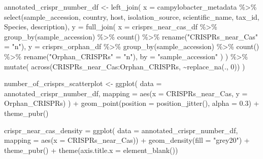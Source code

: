 \documentclass[
  twocolumn,
  landscape]{report}
\newenvironment{Shaded}{}{}
\newcommand{\AttributeTok}[1]{\textcolor[rgb]{0.84,0.23,0.29}{#1}}
\newcommand{\DecValTok}[1]{\textcolor[rgb]{0.00,0.36,0.77}{#1}}
\newcommand{\FloatTok}[1]{\textcolor[rgb]{0.00,0.36,0.77}{#1}}
\newcommand{\FunctionTok}[1]{\textcolor[rgb]{0.44,0.26,0.76}{#1}}
\newcommand{\NormalTok}[1]{\textcolor[rgb]{0.14,0.16,0.18}{#1}}
\newcommand{\OtherTok}[1]{\textcolor[rgb]{0.44,0.26,0.76}{#1}}
\newcommand{\SpecialCharTok}[1]{\textcolor[rgb]{0.00,0.36,0.77}{#1}}
\newcommand{\StringTok}[1]{\textcolor[rgb]{0.01,0.18,0.38}{#1}}
\begin{document}
\begin{Shaded}
\begin{Highlighting}[]
\NormalTok{annotated\_crispr\_number\_df }\OtherTok{\textless{}{-}} \FunctionTok{left\_join}\NormalTok{(}
  \AttributeTok{x =}\NormalTok{ campylobacter\_metadata }\SpecialCharTok{\%\textgreater{}\%}
    \FunctionTok{select}\NormalTok{(sample\_accession, country, host, isolation\_source,}
\NormalTok{           scientific\_name, tax\_id, Species, description),}
  \AttributeTok{y =} \FunctionTok{full\_join}\NormalTok{(}
    \AttributeTok{x =}\NormalTok{ crisprs\_near\_cas\_df }\SpecialCharTok{\%\textgreater{}\%}
      \FunctionTok{group\_by}\NormalTok{(sample\_accession) }\SpecialCharTok{\%\textgreater{}\%}
      \FunctionTok{count}\NormalTok{() }\SpecialCharTok{\%\textgreater{}\%}
      \FunctionTok{rename}\NormalTok{(}\StringTok{"CRISPRs\_near\_Cas"} \OtherTok{=} \StringTok{"n"}\NormalTok{),}
    \AttributeTok{y =}\NormalTok{ crisprs\_orphan\_df }\SpecialCharTok{\%\textgreater{}\%}
      \FunctionTok{group\_by}\NormalTok{(sample\_accession) }\SpecialCharTok{\%\textgreater{}\%}
      \FunctionTok{count}\NormalTok{() }\SpecialCharTok{\%\textgreater{}\%}
      \FunctionTok{rename}\NormalTok{(}\StringTok{"Orphan\_CRISPRs"} \OtherTok{=} \StringTok{"n"}\NormalTok{),}
    \AttributeTok{by =} \StringTok{"sample\_accession"}
\NormalTok{  )}
\NormalTok{) }\SpecialCharTok{\%\textgreater{}\%}
  \FunctionTok{mutate}\NormalTok{(}
    \FunctionTok{across}\NormalTok{(CRISPRs\_near\_Cas}\SpecialCharTok{:}\NormalTok{Orphan\_CRISPRs,}
           \SpecialCharTok{\textasciitilde{}}\FunctionTok{replace\_na}\NormalTok{(., }\DecValTok{0}\NormalTok{))}
\NormalTok{  )}

\NormalTok{number\_of\_crisprs\_scatterplot }\OtherTok{\textless{}{-}} \FunctionTok{ggplot}\NormalTok{(}
  \AttributeTok{data =}\NormalTok{ annotated\_crispr\_number\_df,}
  \AttributeTok{mapping =} \FunctionTok{aes}\NormalTok{(}\AttributeTok{x =}\NormalTok{ CRISPRs\_near\_Cas,}
                \AttributeTok{y =}\NormalTok{ Orphan\_CRISPRs)}
\NormalTok{) }\SpecialCharTok{+}
  \FunctionTok{geom\_point}\NormalTok{(}\AttributeTok{position =} \FunctionTok{position\_jitter}\NormalTok{(),}
             \AttributeTok{alpha =} \FloatTok{0.3}\NormalTok{) }\SpecialCharTok{+}
  \FunctionTok{theme\_pubr}\NormalTok{()}

\NormalTok{crispr\_near\_cas\_density }\OtherTok{=} \FunctionTok{ggplot}\NormalTok{(}
  \AttributeTok{data =}\NormalTok{ annotated\_crispr\_number\_df,}
  \AttributeTok{mapping =} \FunctionTok{aes}\NormalTok{(}\AttributeTok{x =}\NormalTok{ CRISPRs\_near\_Cas)) }\SpecialCharTok{+}
  \FunctionTok{geom\_density}\NormalTok{(}\AttributeTok{fill =} \StringTok{"grey20"}\NormalTok{) }\SpecialCharTok{+}
  \FunctionTok{theme\_pubr}\NormalTok{() }\SpecialCharTok{+}
  \FunctionTok{theme}\NormalTok{(}\AttributeTok{axis.title.x =} \FunctionTok{element\_blank}\NormalTok{())}


\end{Highlighting}
\end{Shaded}
\end{document}
